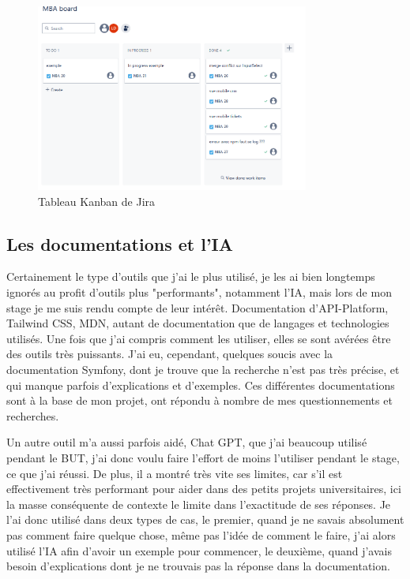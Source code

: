 \documentclass[a4paper,12pt]{report}
\begin{document}
\begin{figure}[h]
    \centering
    \includegraphics[width=0.8\textwidth]{kanban.png}
    \caption{Tableau Kanban de Jira}
    \label{fig:kanban-jira}
\end{figure}

\subsection{Les documentations et l'IA}
Certainement le type d'outils que j'ai le plus utilisé, je les ai bien longtemps ignorés au profit d'outils plus "performants", notamment l'IA, mais lors de mon stage je me suis rendu compte de leur intérêt. Documentation d'API-Platform, Tailwind CSS, MDN, autant de documentation que de langages et technologies utilisés. Une fois que j'ai compris comment les utiliser, elles se sont avérées être des outils très puissants. J'ai eu, cependant, quelques soucis avec la documentation Symfony, dont je trouve que la recherche n'est pas très précise, et qui manque parfois d'explications et d'exemples. Ces différentes documentations sont à la base de mon projet, ont répondu à nombre de mes questionnements et recherches.

Un autre outil m'a aussi parfois aidé, Chat GPT, que j'ai beaucoup utilisé pendant le BUT, j'ai donc voulu faire l'effort de moins l'utiliser pendant le stage, ce que j'ai réussi. De plus, il a montré très vite ses limites, car s'il est effectivement très performant pour aider dans des petits projets universitaires, ici la masse conséquente de contexte le limite dans l'exactitude de ses réponses. Je l'ai donc utilisé dans deux types de cas, le premier, quand je ne savais absolument pas comment faire quelque chose, même pas l'idée de comment le faire, j'ai alors utilisé l'IA afin d'avoir un exemple pour commencer, le deuxième, quand j'avais besoin d'explications dont je ne trouvais pas la réponse dans la documentation.
\end{document}
